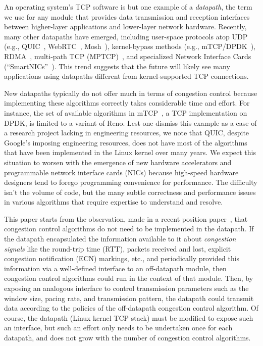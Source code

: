 An operating system's TCP software is but one example of a {\em datapath}, the term we use for any module that provides data transmission and reception interfaces between higher-layer applications and lower-layer network hardware. Recently, many other datapaths have emerged, including user-space protocols atop UDP (e.g., QUIC~\cite{quic}, WebRTC~\cite{webrtc}, Mosh~\cite{mosh}), kernel-bypass methods (e.g., mTCP/DPDK~\cite{dpdk,mtcp,netmap}), RDMA~\cite{dcqcn}, multi-path TCP (MPTCP)~\cite{mptcp}, and specialized Network Interface Cards (``SmartNICs''~\cite{smartnic}). This trend suggests that the future will likely see many applications using datapaths different from kernel-supported TCP connections.

New datapaths typically do not offer much in terms of congestion control because implementing these algorithms correctly takes considerable time and effort. For instance, the set of available algorithms in mTCP~\cite{mtcp}, a TCP implementation on DPDK, is limited to a variant of Reno. 
Lest one dismiss this example as a case of a research project lacking in engineering resources, we note that QUIC, despite Google's imposing engineering resources, does not have most of the algorithms that have been implemented in the Linux kernel over many years.  
We expect this situation to worsen with the emergence of new hardware accelerators and programmable network interface cards (NICs) because high-speed hardware designers tend to forego programming convenience for performance. The difficulty isn't the volume of code, but the many subtle correctness and performance issues in various algorithms that require expertise to understand and resolve.

This paper starts from the observation, made in a recent position paper~\cite{ccp-hotnets}, that congestion control algorithms do not need to be implemented in the datapath. If the datapath encapsulated the information available to it about {\em congestion signals} like the round-trip time (RTT), packets received and lost, explicit congestion notification (ECN) markings, etc., and periodically provided this information via a well-defined interface to an off-datapath module, then congestion control algorithms could run in the context of that module. Then, by exposing an analogous interface to control transmission parameters such as the window size, pacing rate, and transmission pattern, the datapath could transmit data according to the policies of the off-datapath congestion control algorithm. 
Of course, the datapath (\eg Linux kernel TCP stack) must be modified to expose
such an interface, but such an effort only needs to be undertaken once for each
datapath, and does not grow with the number of congestion control algorithms.

